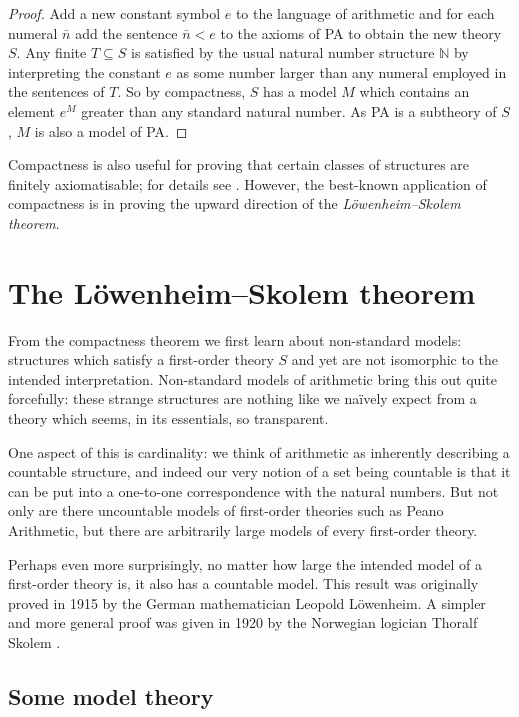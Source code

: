\documentclass[10pt, a4paper, oneside]{article}
\theoremstyle{definition}
\theoremstyle{remark}
\theoremstyle{plain}
\theoremstyle{plain}
\begin{document}
\begin{proof}
    Add a new constant symbol $e$ to the language of arithmetic and for each
    numeral $\bar{n}$ add the sentence $\bar{n} < e$ to the axioms of PA to
    obtain the new theory $S$. Any finite $T \subseteq S$ is satisfied by the
    usual natural number structure $\mathbb{N}$ by interpreting the constant $e$
    as some number larger than any numeral employed in the sentences of $T$. So
    by compactness, $S$ has a model $M$ which contains an element $e^M$ greater
    than any standard natural number. As PA is a subtheory of $S$, $M$ is also a
    model of PA.
\end{proof}

Compactness is also useful for proving that certain classes of structures are
finitely axiomatisable; for details see \citealt[pp. 114--116]{vdalen2004}.
However, the best-known application of compactness is in proving the upward
direction of the \emph{Löwenheim--Skolem theorem}.


\section{The Löwenheim--Skolem theorem}

From the compactness theorem we first learn about non-standard models:
structures which satisfy a first-order theory $S$ and yet are not isomorphic to
the intended interpretation. Non-standard models of arithmetic bring this out
quite forcefully: these strange structures are nothing like we naïvely expect
from a theory which seems, in its essentials, so transparent.

One aspect of this is cardinality: we think of arithmetic as inherently
describing a countable structure, and indeed our very notion of a set being
countable is that it can be put into a one-to-one correspondence with the
natural numbers. But not only are there uncountable models of first-order
theories such as Peano Arithmetic, but there are arbitrarily large models of
every first-order theory.

Perhaps even more surprisingly, no matter how large the intended model of a
first-order theory is, it also has a countable model. This result was originally
proved in 1915 by the German mathematician Leopold Löwenheim. A simpler and more
general proof was given in 1920 by the Norwegian logician Thoralf Skolem
\citep{lowenheim1915, skolem1920}.

\subsection{Some model theory}
\end{document}
